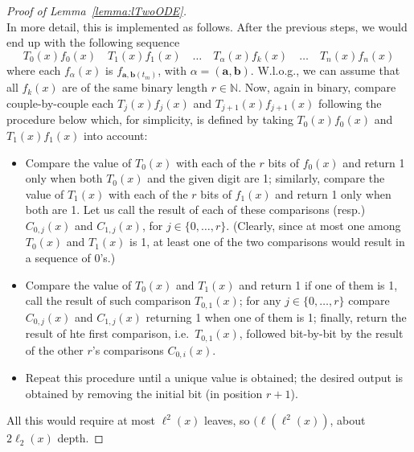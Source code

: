 \documentclass[11pt, oneside]{article}
\newcommand{\Nat}{\mathbb{N}}
\newcommand{\tu}[1]{\mathbf{#1}}
\theoremstyle{definition}
\begin{document}
\begin{toappendix}
\begin{proof}[Proof of Lemma~\ref{lemma:lTwoODE}]
{        %
        \\
        In more detail, this is implemented as follows.
        After the previous steps, we would end up with the following sequence
        $$
        T_0(x) f_0(x) \quad T_1(x) f_1(x) \quad \dots \quad T_{\alpha}(x) f_k(x) \quad \dots \quad T_n(x)f_n(x)
        $$
        where each $f_{\alpha}(x)$ is  $f_{\tu a, \tu b(t_m)}$, with $\alpha=(\tu a, \tu b)$.
        W.l.o.g., we can assume that all $f_k(x)$ are of the same binary length $r\in \Nat$.
        Now, again in binary, compare couple-by-couple each $T_j(x)f_j(x)$ and $T_{j+1}(x) f_{j+1}(x)$ following the procedure below which, for simplicity, is defined by taking $T_0(x)f_0(x)$ and $T_1(x)f_1(x)$ into account:
        \begin{itemize}
        \itemsep0em
            \item Compare the value of $T_0(x)$ with each of the $r$ bits of $f_0(x)$ and return 1 only when both $T_0(x)$ and the given digit are 1; similarly, compare the value of $T_1(x)$ with each of the $r$ bits of $f_1(x)$ and return 1 only when both are 1.
            Let us call the result of each of these comparisons (resp.) $C_{0,j}(x)$ and $C_{1,j}(x)$, for $j\in \{0, \dots, r\}$.
            (Clearly, since at most one among $T_0(x)$ and $T_1(x)$ is 1, at least one of the two comparisons would result in a sequence of 0's.)
            \item Compare the value of $T_0(x)$ and $T_1(x)$ and return 1 if one of them is 1, call the result of such comparison $T_{0,1}(x)$; for any $j\in \{0,\dots, r\}$ compare $C_{0,j}(x)$ and $C_{1,j}(x)$ returning 1 when one of them is 1; finally, return the result of hte first comparison, i.e.~$T_{0,1}(x)$, followed bit-by-bit by the result of the other $r$'s comparisons $C_{0,i}(x)$.
            \item Repeat this procedure until a unique value is obtained; the desired output is obtained by removing the initial bit (in position $r+1$).        \end{itemize}
  
    All this would require at most $\ell^2(x)$ leaves, so $(\ell(\ell^2(x))$, about $2\ell_2(x)$ depth.
 } %
\end{proof}










\end{toappendix}
\end{document}
